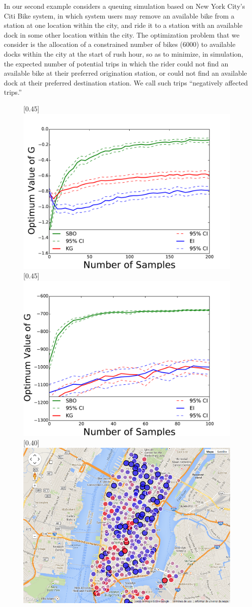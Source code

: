 \documentclass{article}
\begin{document}
In our second example considers a queuing simulation based on New York City's Citi Bike system, in which system users may remove an available bike from a station at one location within the city, and ride it to a station with an available dock in some other location within the city.  The optimization problem that we consider is the allocation of a constrained number of bikes (6000) to available docks within the city at the start of rush hour, so as to minimize, in simulation, the expected number of potential trips in which the rider could not find an available bike at their preferred origination station, or could not find an available dock at their preferred destination station.  We call such trips ``negatively affected trips.''

\begin{figure}[!htb]
    \centering
    [0.45\linewidth]{
    \includegraphics[width=0.45\linewidth]{comparisonSameanal.pdf}}
    \quad
    [0.45\linewidth]{
      \includegraphics[width=0.45\linewidth]{comparisonSameConfiguration.pdf}}
          \quad
     [0.40\linewidth]{
      \includegraphics[width=0.50\linewidth]{testStationMapPng0-full.png}}

\end{figure}
\end{document}
